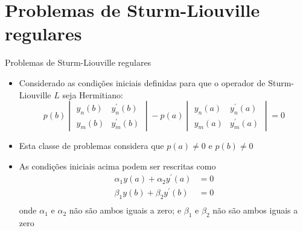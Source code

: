    \section[ slide = true ]{Problemas de Sturm-Liouville regulares}
      \begin{slide}[toc=]{Problemas de Sturm-Liouville regulares}
	      \begin{itemize}
		      \item Considerado as condições iniciais definidas para que o operador de Sturm-Liouville $L$ seja Hermitiano:
				\begin{equation*}
					p(b)\begin{vmatrix}y_n(b) & y_n^\prime(b)\\ y_m(b) & y_m^\prime(b)\end{vmatrix}-p(a)\begin{vmatrix}y_n(a) & y_n^\prime(a)\\ y_m(a) & y_m^\prime(a)\end{vmatrix}= 0
				\end{equation*}
			\item Esta classe de problemas considera que $p(a)\neq 0$ e $p(b)\neq 0$
			\item As condições iniciais acima podem ser rescritas como
				\begin{align*}
					\alpha_1y(a) + \alpha_2 y^\prime (a) &= 0\\
					\beta_1 y(b) + \beta_2 y^\prime (b) &= 0\\
				\end{align*}
				onde $\alpha_1$ e $\alpha_2$ não são ambos iguais a zero; e $\beta_1$ e $\beta_2$ não são ambos iguais a zero
	      \end{itemize}
      \end{slide}

